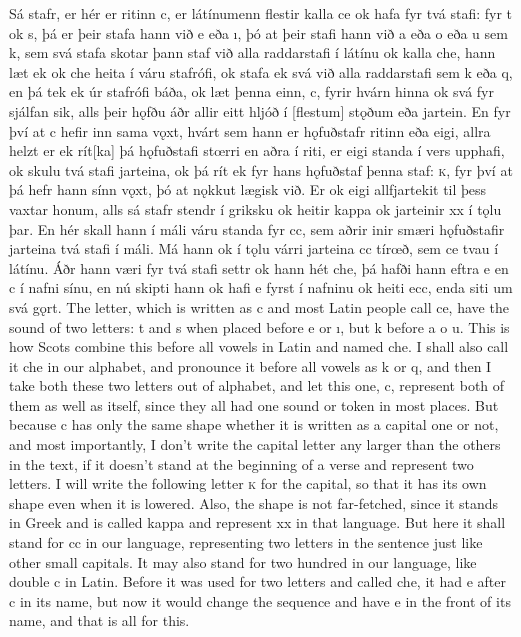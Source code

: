 \begin{paracol}{2}
    Sá stafr, er hér er ritinn c, er látínumenn flestir kalla ce ok hafa fyr tvá stafi: fyr t ok s, þá er þeir stafa hann við e eða ı, þó at þeir stafi hann við a eða o eða u sem k, sem svá stafa skotar þann staf við alla raddarstafi í látínu ok kalla che, hann læt ek ok che heita í váru stafrófi, ok stafa ek svá við alla raddarstafi sem k eða q, en þá tek ek úr stafrófi báða, ok læt þenna einn, c, fyrir hvárn hinna ok svá fyr sjálfan sik, alls þeir hǫfðu áðr allir eitt hljóð í [flestum] stǫðum eða jartein. En fyr því at c hefir inn sama vǫxt, hvárt sem hann er hǫfuðstafr ritinn eða eigi, allra helzt er ek rít[ka] þá hǫfuðstafi stœrri en aðra í riti, er eigi standa í vers upphafi, ok skulu tvá stafi jarteina, ok þá rít ek fyr hans hǫfuðstaf þenna staf: \textsc{k}, fyr því at þá hefr hann sínn vǫxt, þó at nǫkkut lægisk við. Er ok eigi allfjartekit til þess vaxtar honum, alls sá stafr stendr í griksku ok heitir kappa ok jarteinir xx í tǫlu þar. En hér skall hann í máli váru standa fyr cc, sem aðrir inir smæri hǫfuðstafir jarteina tvá stafi í máli. Má hann ok í tǫlu várri jarteina cc tírœð, sem ce tvau í látínu. Áðr hann væri fyr tvá stafi settr ok hann hét che, þá hafði hann eftra e en c í nafni sínu, en nú skipti hann ok hafi e fyrst í nafninu ok heiti ecc, enda siti um svá gǫrt.
    \switchcolumn
    The letter, which is written as c and most Latin people call ce, have the sound of two letters: t and s when placed before e or ı, but k before a o u. This is how Scots combine this before all vowels in Latin and named che. I shall also call it che in our alphabet, and pronounce it before all vowels as k or q, and then I take both these two letters out of alphabet, and let this one, c, represent both of them as well as itself, since they all had one sound or token in most places. But because c has only the same shape whether it is written as a capital one or not, and most importantly, I don't write the capital letter any larger than the others in the text, if it doesn't stand at the beginning of a verse and represent two letters. I will write the following letter \textsc{k} for the capital, so that it has its own shape even when it is lowered. Also, the shape is not far-fetched, since it stands in Greek and is called kappa and represent xx in that language. But here it shall stand for cc in our language, representing two letters in the sentence just like other small capitals. It may also stand for two hundred in our language, like double c in Latin. Before it was used for two letters and called che, it had e after c in its name, but now it would change the sequence and have e in the front of its name, and that is all for this.
\end{paracol}
